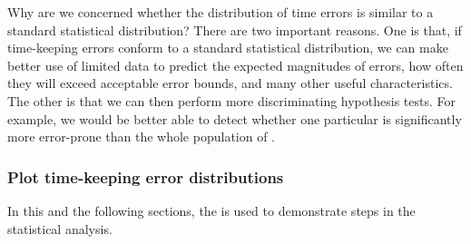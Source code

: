 Why are we concerned whether the distribution of time errors is similar to a standard statistical distribution? 
There are two important reasons. 
One is that, if time-keeping errors conform to a standard statistical distribution, we can make better use of limited data to predict the expected magnitudes of errors, how often they will exceed acceptable error bounds, and many other useful characteristics. 
The other is that we can then perform more discriminating hypothesis tests.
For example, we would be better able to detect whether one particular \rtc is significantly more error-prone than the whole population of \rtcs.


\subsubsection{\howto Plot time-keeping error distributions}
In this and the following sections, the  is used to demonstrate steps in the statistical analysis. 

